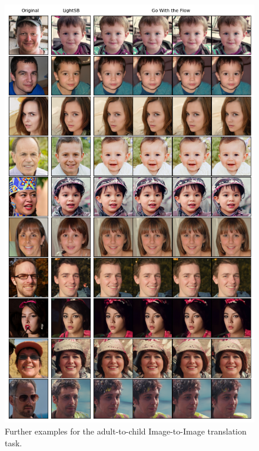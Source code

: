 \documentclass[twoside]{article}
\newtheorem{corollary}{Corollary}
\renewcommand{\eqref}[1]{(\ref{#1})}
\newcommand{\X}{\mathcal{X}}
\renewcommand{\P}{\mathbb{P}}
\begin{document}
\begin{figure}
    \centering
    \includegraphics[width=0.7 \linewidth]{figures/A2C_extended.png}
    \caption{Further examples for the adult-to-child Image-to-Image translation task.}
    \label{fig:a2c_extended}
\end{figure}
%
% 
\end{document}
